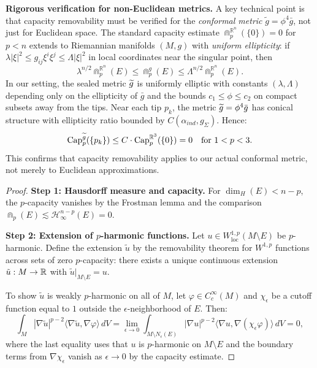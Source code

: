 \begin{remark}
\textbf{Rigorous verification for non-Euclidean metrics.} A key technical point is that capacity removability must be verified for the \emph{conformal metric} $\tilde{g} = \phi^4 \bar{g}$, not just for Euclidean space. The standard capacity estimate $\Cap_p^{\mathbb{R}^n}(\{0\}) = 0$ for $p < n$ extends to Riemannian manifolds $(M, g)$ with \emph{uniform ellipticity}: if $\lambda |\xi|^2 \le g_{ij}\xi^i\xi^j \le \Lambda |\xi|^2$ in local coordinates near the singular point, then
\begin{equation}\label{eq:CapacityComparison}
    \lambda^{n/2} \Cap_p^{\mathbb{R}^n}(E) \le \Cap_p^g(E) \le \Lambda^{n/2} \Cap_p^{\mathbb{R}^n}(E).
\end{equation}
In our setting, the sealed metric $\widetilde{g}$ is uniformly elliptic with constants $(\lambda, \Lambda)$ depending only on the ellipticity of $\bar{g}$ and the bounds $c_1 \le \phi \le c_2$ on compact subsets away from the tips. Near each tip $p_k$, the metric $\widetilde{g} = \phi^4 \bar{g}$ has conical structure with ellipticity ratio bounded by $C(\alpha_{ind}, g_\Sigma)$. Hence:
\[
    \text{Cap}_p^{\widetilde{g}}(\{p_k\}) \le C \cdot \text{Cap}_p^{\mathbb{R}^3}(\{0\}) = 0 \quad \text{for } 1 < p < 3.
\]
This confirms that capacity removability applies to our actual conformal metric, not merely to Euclidean approximations.
\end{remark}

\begin{proof}
\textbf{Step 1: Hausdorff measure and capacity.}
For $\dim_H(E) < n - p$, the $p$-capacity vanishes by the Frostman lemma and the comparison $\Cap_p(E) \lesssim \mathcal{H}^{n-p}_\infty(E) = 0$.

\textbf{Step 2: Extension of $p$-harmonic functions.}
Let $u \in W^{1,p}_{\mathrm{loc}}(M \setminus E)$ be $p$-harmonic. Define the extension $\tilde{u}$ by the removability theorem for $W^{1,p}$ functions across sets of zero $p$-capacity: there exists a unique continuous extension $\tilde{u}: M \to \mathbb{R}$ with $\tilde{u}|_{M \setminus E} = u$.

To show $\tilde{u}$ is weakly $p$-harmonic on all of $M$, let $\varphi \in C^\infty_c(M)$ and $\chi_\epsilon$ be a cutoff function equal to $1$ outside the $\epsilon$-neighborhood of $E$. Then:
\begin{equation}
    \int_M |\nabla \tilde{u}|^{p-2} \langle \nabla \tilde{u}, \nabla \varphi \rangle \, dV = \lim_{\epsilon \to 0} \int_{M \setminus N_\epsilon(E)} |\nabla u|^{p-2} \langle \nabla u, \nabla (\chi_\epsilon \varphi) \rangle \, dV = 0,
\end{equation}
where the last equality uses that $u$ is $p$-harmonic on $M \setminus E$ and the boundary terms from $\nabla \chi_\epsilon$ vanish as $\epsilon \to 0$ by the capacity estimate.
\end{proof}

